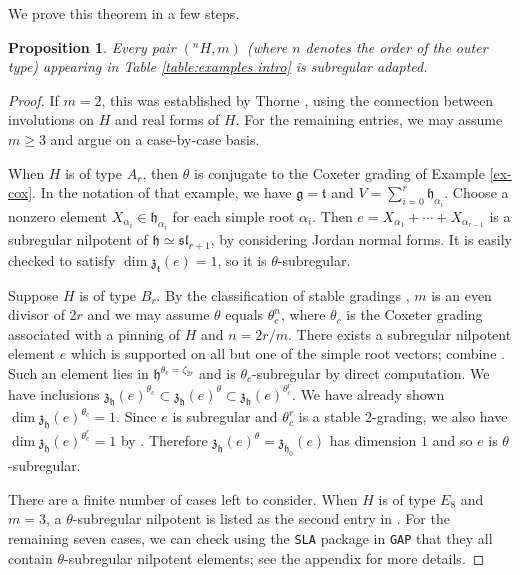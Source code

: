 \documentclass{article} %
\newtheorem{proposition}{Proposition}[section]
\numberwithin{equation}{section}
\theoremstyle{definition}
\newcommand{\frakg}{\mathfrak g}
\newcommand{\frakh}{\mathfrak h}
\newcommand{\frakz}{\mathfrak z}
\newcommand{\frakt}{\mathfrak t}
\newcommand{\fraksl}{\mathfrak{sl}}
\newcommand{\rl}{r} %
\begin{document}
We prove this theorem in a few steps. 
\begin{proposition}\label{proposition: tabulated gradings are subregular adapted}
    Every pair $({}^nH, m)$ (where $n$ denotes the order of the outer type) appearing in Table \ref{table:examples intro} is subregular adapted.
\end{proposition}
\begin{proof}
    If $m=2$, this was established by Thorne \cite[Lemma 2.21 and Theorem 2.22]{Thorne-thesis}, using the connection between involutions on $H$ and real forms of $H$.
    For the remaining entries, we may assume $m\geq 3$ and argue on a case-by-case basis.
    
    When $H$ is of type $A_\rl$, then $\theta$ is conjugate to the Coxeter grading of Example \ref{ex-cox}. 
    In the notation of that example, we have $\frakg = \frakt$ and $V = \sum_{i=0}^{\rl} \frakh_{\alpha_i}$.
    Choose a nonzero element $X_{\alpha_i} \in \frakh_{\alpha_i}$ for each simple root $\alpha_i$. Then $e = X_{\alpha_1} + \cdots + X_{\alpha_{\rl-1}}$ is a subregular nilpotent of $\frakh \simeq \fraksl_{\rl+1}$, by considering Jordan normal forms. It is easily checked to satisfy $\dim \frakz_{\frakt}(e) = 1$, so it is $\theta$-subregular.

    Suppose $H$ is of type $B_\rl$. 
    By the classification of stable gradings \cite[Section 7.2, Table 12]{GrossLevyReederYu-GradingsPosRank}, $m$ is an even divisor of $2\rl$ and we may assume $\theta$ equals $\theta_{c}^n$, where $\theta_{c}$ is the Coxeter grading associated with a pinning of $H$ and $n = 2\rl/m$.
    There exists a subregular nilpotent element $e$ which is supported on all but one of the simple root vectors; combine \cite[Propositions 5.2.5 and 5.4.1]{CollingwoodMcGovern-nilpotentorbits}.
    Such an element lies in $\frakh^{\theta_{c} = \zeta_{2\rl}}$ and is $\theta_{c}$-subregular by direct computation.
    We have inclusions $\frakz_{\frakh}(e)^{\theta_{c}} \subset \frakz_{\frakh}(e)^{\theta} \subset \frakz_{\frakh}(e)^{\theta_{c}^\rl}$.
    We have already shown $\dim \frakz_{\frakh}(e)^{\theta_{c}} = 1$.
    Since $e$ is subregular and $\theta_{c}^\rl$ is a stable $2$-grading, we also have $\dim\frakz_{\frakh}(e)^{\theta_{c}^\rl} = 1$ by \cite[Lemma 2.21]{Thorne-thesis}.
    Therefore $\frakz_{\frakh}(e)^{\theta} = \frakz_{\frakh_0}(e)$ has dimension $1$ and so $e$ is $\theta$-subregular.

    There are a finite number of cases left to consider. When $H$ is of type $E_8$ and $m=3$, a $\theta$-subregular nilpotent is listed as the second entry in \cite[Table 6]{VinbergElasvili-trivectors}.
    For the remaining seven cases, we can check using the \texttt{SLA} package \cite{SLA} in \texttt{GAP} \cite{GAP4}  that they all contain $\theta$-subregular nilpotent elements; see the appendix for more details. 
\end{proof}
\end{document}
